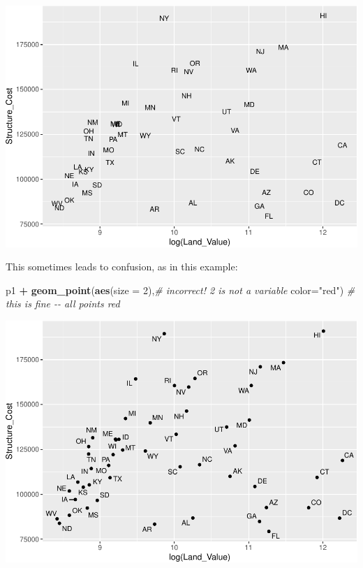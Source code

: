 \documentclass[
]{book}
\newenvironment{Shaded}{\begin{snugshade}}{\end{snugshade}}
\newcommand{\CommentTok}[1]{\textcolor[rgb]{0.56,0.35,0.01}{\textit{#1}}}
\newcommand{\DataTypeTok}[1]{\textcolor[rgb]{0.13,0.29,0.53}{#1}}
\newcommand{\DecValTok}[1]{\textcolor[rgb]{0.00,0.00,0.81}{#1}}
\newcommand{\KeywordTok}[1]{\textcolor[rgb]{0.13,0.29,0.53}{\textbf{#1}}}
\newcommand{\NormalTok}[1]{#1}
\newcommand{\OperatorTok}[1]{\textcolor[rgb]{0.81,0.36,0.00}{\textbf{#1}}}
\newcommand{\StringTok}[1]{\textcolor[rgb]{0.31,0.60,0.02}{#1}}
\begin{document}
\includegraphics{R/Rgraphics/figures/unnamed-chunk-150-1.pdf}

This sometimes leads to confusion, as in this example:

\begin{Shaded}
\begin{Highlighting}[]
\NormalTok{p1 }\OperatorTok{+}
\StringTok{  }\KeywordTok{geom\_point}\NormalTok{(}\KeywordTok{aes}\NormalTok{(}\DataTypeTok{size =} \DecValTok{2}\NormalTok{),}\CommentTok{\# incorrect! 2 is not a variable}
             \DataTypeTok{color=}\StringTok{"red"}\NormalTok{) }\CommentTok{\# this is fine {-}{-} all points red}
\end{Highlighting}
\end{Shaded}

\includegraphics{R/Rgraphics/figures/unnamed-chunk-151-1.pdf}
\end{document}
